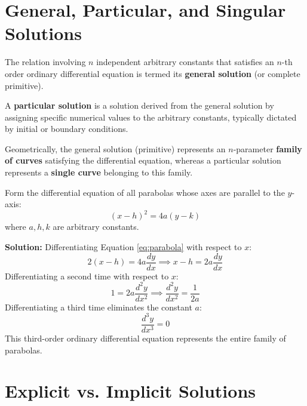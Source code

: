 \documentclass[11pt, a4paper, openany, oneside]{book}
\begin{document}
\section{General, Particular, and Singular Solutions}

\begin{definitionbox}
The relation involving $n$ independent arbitrary constants that satisfies an $n$-th order ordinary differential equation is termed its \textbf{general solution} (or complete primitive).
\end{definitionbox}

\begin{definitionbox}
A \textbf{particular solution} is a solution derived from the general solution by assigning specific numerical values to the arbitrary constants, typically dictated by initial or boundary conditions.
\end{definitionbox}

\begin{summarybox}
Geometrically, the general solution (primitive) represents an $n$-parameter \textbf{family of curves} satisfying the differential equation, whereas a particular solution represents a \textbf{single curve} belonging to this family.
\end{summarybox}

\begin{examplebox}
Form the differential equation of all parabolas whose axes are parallel to the $y$-axis:
\begin{equation}
    (x - h)^2 = 4a(y - k) \label{eq:parabola}
\end{equation}
where $a, h, k$ are arbitrary constants.

\textbf{Solution:}
Differentiating Equation \eqref{eq:parabola} with respect to $x$:
\[
2(x - h) = 4a \frac{dy}{dx} \implies x - h = 2a \frac{dy}{dx}
\]
Differentiating a second time with respect to $x$:
\[
1 = 2a \frac{d^2 y}{dx^2} \implies \frac{d^2 y}{dx^2} = \frac{1}{2a}
\]
Differentiating a third time eliminates the constant $a$:
\begin{equation}
    \frac{d^3 y}{dx^3} = 0
\end{equation}
This third-order ordinary differential equation represents the entire family of parabolas.
\end{examplebox}

\section{Explicit vs. Implicit Solutions}
\end{document}
